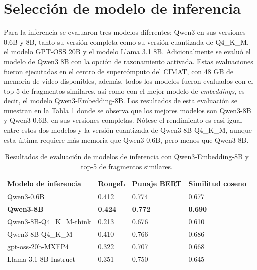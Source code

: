 \section{Selección de modelo de inferencia}

Para la inferencia se evaluaron tres modelos diferentes: Qwen3 en sus versiones
0.6B y 8B, tanto su versión completa como su versión cuantizada de Q4\_K\_M,
el modelo GPT-OSS 20B y el modelo Llama 3.1 8B. Adicionalmente se evaluó
el modelo de Qwen3 8B con la opción de razonamiento activada. Estas evaluaciones
fueron ejecutadas en el centro de supercómputo del CIMAT, con 48 GB de memoria
de video disponibles, además, todos los
modelos fueron evaluados con el top-5 de fragmentos similares, así como
con el mejor modelo de \textit{embeddings}, es decir, el modelo
Qwen3-Embedding-8B. Los resultados de esta evaluación se muestran en la
Tabla \ref{tab:metrics_inferencia} donde se observa que los mejores modelos
son Qwen3-8B y Qwen3-0.6B, en sus versiones completas.
Nótese el rendimiento es casi igual entre estos dos modelos y
la versión cuantizada de Qwen3-8B-Q4\_K\_M, aunque esta última requiere
más memoria que Qwen3-0.6B, pero menos que Qwen3-8B.

\begin{table}[!ht]
    \centering
    \begin{tabular}{|l|l|l|l|}
        \hline
        Modelo de inferencia    & RougeL         & Punaje BERT    & Similitud coseno \\ \hline
        Qwen3-0.6B              & 0.412          & 0.774          & 0.677            \\ \hline
        \textbf{Qwen3-8B}       & \textbf{0.424} & \textbf{0.772} & \textbf{0.690}   \\ \hline
        Qwen3-8B-Q4\_K\_M-think & 0.213          & 0.676          & 0.610            \\ \hline
        Qwen3-8B-Q4\_K\_M       & 0.410          & 0.766          & 0.686            \\ \hline
        gpt-oss-20b-MXFP4       & 0.322          & 0.707          & 0.668            \\ \hline
        Llama-3.1-8B-Instruct   & 0.351          & 0.750          & 0.645            \\ \hline
    \end{tabular}
    \caption{Resultados de evaluación de modelos de inferencia con Qwen3-Embedding-8B
        y top-5 de fragmentos similares.}
    \label{tab:metrics_inferencia}
\end{table}

